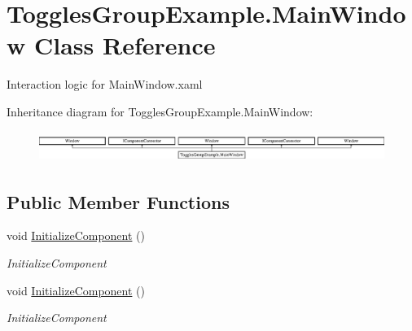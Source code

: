 \hypertarget{class_toggles_group_example_1_1_main_window}{}\section{Toggles\+Group\+Example.\+Main\+Window Class Reference}
\label{class_toggles_group_example_1_1_main_window}


Interaction logic for Main\+Window.\+xaml  


Inheritance diagram for Toggles\+Group\+Example.\+Main\+Window\+:\begin{figure}[H]
\begin{center}
\leavevmode
\includegraphics[height=1.009009cm]{d6/d5a/class_toggles_group_example_1_1_main_window}
\end{center}
\end{figure}
\subsection*{Public Member Functions}
\begin{DoxyCompactItemize}
\item 
void \mbox{\hyperlink{class_toggles_group_example_1_1_main_window_a8e4c4a18cf57fc212c12a5394a6c0f77}{Initialize\+Component}} ()
\begin{DoxyCompactList}\small\item\em Initialize\+Component \end{DoxyCompactList}\item 
void \mbox{\hyperlink{class_toggles_group_example_1_1_main_window_a8e4c4a18cf57fc212c12a5394a6c0f77}{Initialize\+Component}} ()
\begin{DoxyCompactList}\small\item\em Initialize\+Component \end{DoxyCompactList}\end{DoxyCompactItemize}
